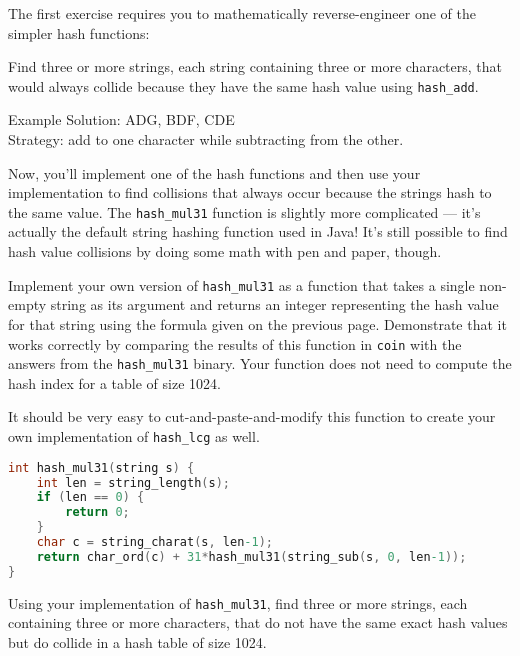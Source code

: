 \newpage
The first exercise requires you to mathematically reverse-engineer one of the
simpler hash functions:

\begin{part}
  Find three or more strings, each string containing three or more
  characters, that would always collide because they have the same
  hash value using \lstinline'hash_add'.
\end{part}

\begin{solution}
Example Solution: ADG, BDF, CDE\\
Strategy: add to one character while subtracting from the other.
\end{solution}

Now, you'll implement one of the hash functions and then use your
implementation to find collisions that always occur because the
strings hash to the same value.  The \lstinline'hash_mul31' function
is slightly more complicated --- it's actually the default string
hashing function used in Java! It's still possible to find hash value
collisions by doing some math with pen and paper, though.

\begin{part}
  Implement your own version of \lstinline'hash_mul31' as a function
  that takes a single non-empty string as its argument and returns an
  integer representing the hash value for that string using the
  formula given on the previous page.  Demonstrate that it works
  correctly by comparing the results of this function in
  \lstinline'coin' with the answers from the \lstinline'hash_mul31'
  binary. Your function does not need to compute the hash index for a
  table of size 1024.

It should be very easy to cut-and-paste-and-modify this function to create your
own implementation of \lstinline'hash_lcg' as well.
\end{part}

\begin{solution}
\begin{lstlisting}[language={C}]
int hash_mul31(string s) {
    int len = string_length(s);
    if (len == 0) {
        return 0;
    }
    char c = string_charat(s, len-1);
    return char_ord(c) + 31*hash_mul31(string_sub(s, 0, len-1));
}
\end{lstlisting}
\end{solution}

\begin{part}
  Using your implementation of \lstinline'hash_mul31', find three or
  more strings, each containing three or more characters, that do not
  have the same exact hash values but do collide in a hash table of
  size 1024.
\end{part}

